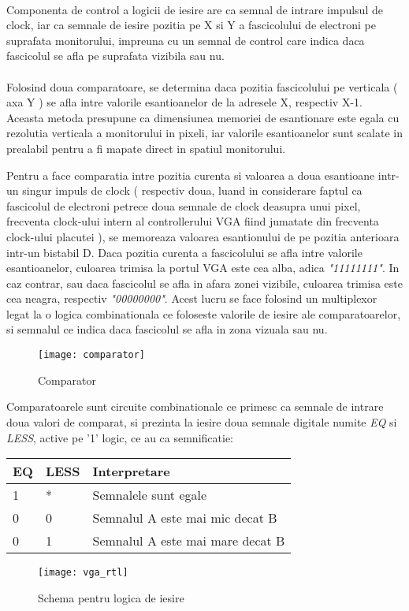 \clearpage
\paragraph{}
Componenta de control a logicii de iesire are ca semnal de intrare impulsul de clock, iar ca semnale de iesire pozitia pe X si Y a fascicolului de electroni pe suprafata monitorului, impreuna cu un semnal de control care indica daca fascicolul se afla pe suprafata vizibila sau nu.

\paragraph{}
Folosind doua comparatoare, se determina daca pozitia fascicolului pe verticala ( axa Y ) se afla intre valorile esantioanelor de la adresele X, respectiv X-1. Aceasta metoda presupune ca dimensiunea memoriei de esantionare este egala cu rezolutia verticala a monitorului in pixeli, iar valorile esantioanelor sunt scalate in prealabil pentru a fi mapate direct in spatiul monitorului.

Pentru a face comparatia intre pozitia curenta si valoarea a doua esantioane intr-un singur impuls de clock ( respectiv doua, luand in considerare faptul ca fascicolul de electroni petrece doua semnale de clock deasupra unui pixel, frecventa clock-ului intern al  controllerului VGA fiind jumatate din frecventa clock-ului placutei ), se memoreaza valoarea esantionului de pe pozitia anterioara intr-un bistabil D. Daca pozitia curenta a fascicolului se afla intre valorile esantioanelor, culoarea trimisa la portul VGA este cea alba, adica \emph{"11111111"}. In caz contrar, sau daca fascicolul se afla in afara zonei vizibile, culoarea trimisa este cea neagra, respectiv \emph{"00000000"}. Acest lucru se face folosind un multiplexor legat la o logica combinationala ce foloseste valorile de iesire ale comparatoarelor, si semnalul ce indica daca fascicolul se afla in zona vizuala sau nu.

\begin{figure}[h]
\centering
\texttt{[image: comparator]}
\caption{Comparator}
\label{fig:comparator}
\end{figure}


Comparatoarele sunt circuite combinationale ce primesc ca semnale de intrare doua valori de comparat, si prezinta la iesire doua semnale digitale numite \emph{EQ} si \emph{LESS}, active pe '1' logic, ce au ca semnificatie:

\begin{center}
    \begin{tabular}{| l | l | l |}
    \hline
    EQ & LESS & Interpretare \\ \hline
	1 & * & Semnalele sunt egale  \\ \hline
    0 & 0 & Semnalul A este mai mic decat B  \\ \hline
    0 & 1 & Semnalul A este mai mare decat B \\ \hline 
    \end{tabular}
\end{center}

\clearpage
\begin{figure}[h]
\centering
\texttt{[image: vga\_rtl]}
\caption{Schema pentru logica de iesire}
\label{fig:vga_rtl}
\end{figure}